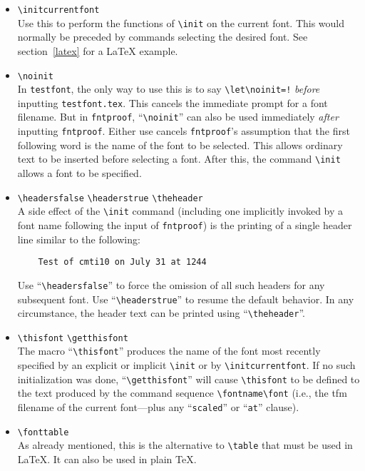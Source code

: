 \documentclass[draft]{article}
\newcommand\file[1]{\texttt{#1}}
\renewcommand\"{\verb"}
\begin{document}
{\begin{itemize}
\item \"\initcurrentfont"\\
    Use this to perform the functions of \"\init" on the current font. 
    This would normally be preceded by commands selecting the desired 
    font. See section~\ref{latex} for a \LaTeX{} example.

\item \"\noinit"\\
    In \file{testfont}, the only way to use this is to say 
    \"\let\noinit=!" \emph{before} inputting \file{testfont.tex}. This 
    cancels the immediate prompt for a font filename. But in 
    \file{fntproof}, ``\"\noinit"'' can also be used immediately 
    \emph{after} inputting \file{fntproof}. Either use cancels 
    \file{fntproof}'s assumption that the first following word is the 
    name of the font to be selected. This allows ordinary text to be 
    inserted before selecting a font. After this, the command \"\init" 
    allows a font to be specified. 

\item \"\headersfalse" \"\headerstrue" \"\theheader"\\
    A side effect of the \"\init" command (including one implicitly
    invoked by a font name following the input of \file{fntproof}) is 
    the printing of a single header line similar to the following:
\begin{verbatim}
    Test of cmti10 on July 31 at 1244
\end{verbatim}
    Use ``\"\headersfalse"'' to force the omission of all such headers 
    for any subsequent font. Use ``\"\headerstrue"'' to resume the 
    default behavior. In any circumstance, the header text can be 
    printed using ``\"\theheader"''.

\item \"\thisfont" \"\getthisfont"\\ 
    The macro ``\"\thisfont"'' produces the name of the font most 
    recently specified by an explicit or implicit \"\init" or by
    \"\initcurrentfont". If no such initialization was done,  
    ``\"\getthisfont"'' will cause \"\thisfont" to be defined to the 
    text produced by the command sequence \"\fontname\font" (i.e., the 
    tfm filename of the current font---plus any ``\texttt{scaled}'' or 
    ``\texttt{at}'' clause).

\item \"\fonttable"\\
    As already mentioned, this is the alternative to \"\table" that must 
    be used in \LaTeX{}. It can also be used in plain \TeX{}.


\end{itemize}}
\end{document}
